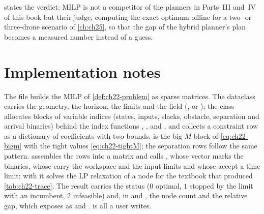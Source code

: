  states the verdict: MILP is not a competitor of the
planners in Parts~III and~IV of this book but their judge, computing the
exact optimum offline for a two- or three-drone scenario of \cref{ch:ch25},
so that the gap of the hybrid planner's plan becomes a measured number
instead of a guess.

\section{Implementation notes}
\label{sec:ch22-implementation}

The file  builds the MILP of
\cref{def:ch22-problem} as sparse matrices. The dataclass 
carries the geometry, the horizon, the limits and the field
 (,  or ); the
class 
allocates blocks of variable indices (states, inputs, slacks, obstacle,
separation and arrival binaries) behind the index functions
, ,  and
, and  collects a constraint row as
a dictionary of coefficients with two bounds.  is
the big-$M$ block of \cref{eq:ch22-bigm} with the tight values
\cref{eq:ch22-tightM}; the separation rows follow the same pattern.
 assembles the rows into a  matrix
and calls ,
whose  vector marks the binaries, whose 
carry the workspace and the input limits and whose  accept a
time limit; with  it solves the LP relaxation of a node
for the textbook  that produced
\cref{tab:ch22-trace}. The result carries the status ($0$ optimal, $1$
stopped by the limit with an incumbent, $2$ infeasible) and, in
 and , the node count and the
relative gap, which  exposes as  and
.  is all a user writes.

